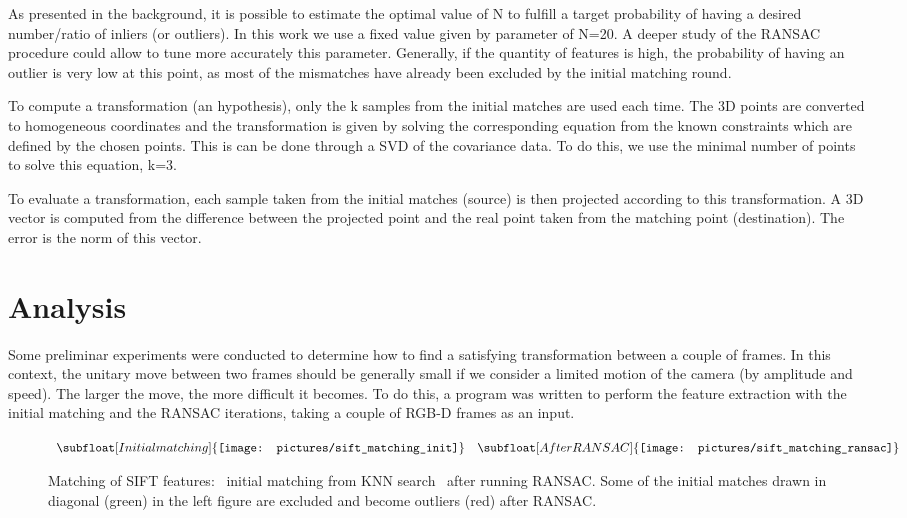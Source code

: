 As presented in the background, it is possible to estimate the optimal value of N to fulfill a target probability of having a desired number/ratio of inliers (or outliers). In this work we use a fixed value given by parameter of N=20. A deeper study of the \gls{RANSAC} procedure could allow to tune more accurately this parameter. Generally, if the quantity of features is high, the probability of having an outlier is very low at this point, as most of the mismatches have already been excluded by the initial matching round.


To compute a transformation (an hypothesis), only the k samples from the initial matches are used each time. The 3D points are converted to homogeneous coordinates and the transformation is given by solving the corresponding equation from the known constraints which are defined by the chosen points. This is can be done through a \gls{SVD} of the covariance data. To do this, we use the minimal number of points to solve this equation, k=3.

To evaluate a transformation, each sample taken from the initial matches (source) is then projected according to this transformation. A 3D vector is computed from the difference between the projected point and the real point taken from the matching point (destination). The error is the norm of this vector.

\section{Analysis}

Some preliminar experiments were conducted to determine how to find a satisfying transformation between a couple of frames. In this context, the unitary move between two frames should be generally small if we consider a limited motion of the camera (by amplitude and speed). The larger the move, the more difficult it becomes. To do this, a program was written to perform the feature extraction with the initial matching and the RANSAC iterations, taking a couple of RGB-D frames as an input.

\begin{figure}[H]
\centering$
 \begin{array}{cc}
 \subfloat[Initial matching]{\label{fig:sift_match_1} \texttt{[image: pictures/sift\_matching\_init]}} &
 \subfloat[After RANSAC]{\label{fig:sift_match_2} \texttt{[image: pictures/sift\_matching\_ransac]}}
 \end{array}$
\caption{Matching of SIFT features: \protect{}~initial matching from KNN search \protect{}~after running RANSAC. Some of the initial matches drawn in diagonal (green) in the left figure are excluded and become outliers (red) after RANSAC.}
\end{figure}

